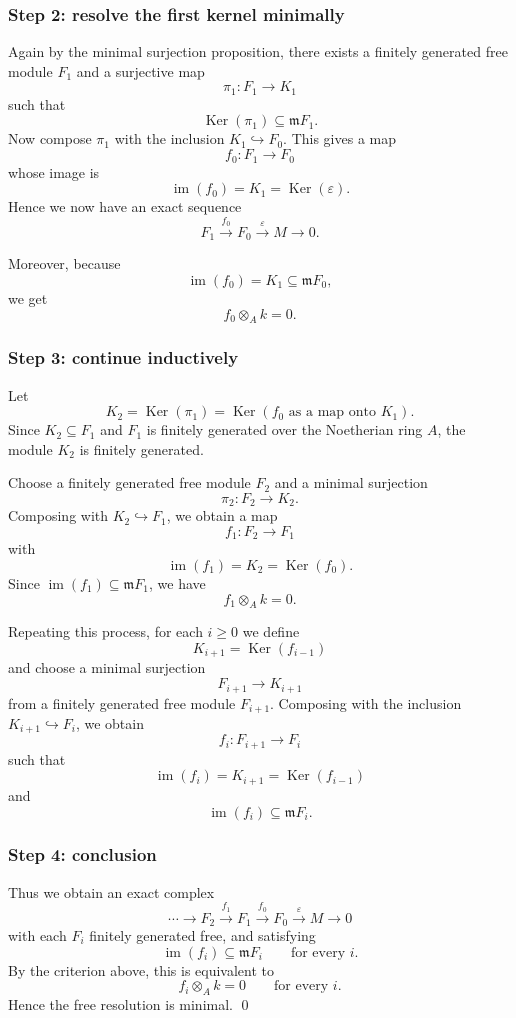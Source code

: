 \documentclass[12pt,a4paper]{article}
\theoremstyle{notespace}
\DeclareMathOperator{\Ker}{Ker}
\DeclareMathOperator{\im}{im}
\newcommand{\m}{\mathfrak m}
\begin{document}
\subsubsection*{Step 2: resolve the first kernel minimally}

Again by the minimal surjection proposition, there exists a finitely generated free module \(F_1\) and a surjective map
\[
\pi_1:F_1\to K_1
\]
such that
\[
\Ker(\pi_1)\subseteq \m F_1.
\]
Now compose \(\pi_1\) with the inclusion \(K_1\hookrightarrow F_0\). This gives a map
\[
f_0:F_1\to F_0
\]
whose image is
\[
\im(f_0)=K_1=\Ker(\varepsilon).
\]
Hence we now have an exact sequence
\[
F_1\xrightarrow{f_0}F_0\xrightarrow{\varepsilon}M\to 0.
\]

Moreover, because
\[
\im(f_0)=K_1\subseteq \m F_0,
\]
we get
\[
f_0\otimes_A k=0.
\]

\subsubsection*{Step 3: continue inductively}

Let
\[
K_2=\Ker(\pi_1)=\Ker(f_0 \text{ as a map onto }K_1).
\]
Since \(K_2\subseteq F_1\) and \(F_1\) is finitely generated over the Noetherian ring \(A\), the module \(K_2\) is finitely generated.

Choose a finitely generated free module \(F_2\) and a minimal surjection
\[
\pi_2:F_2\to K_2.
\]
Composing with \(K_2\hookrightarrow F_1\), we obtain a map
\[
f_1:F_2\to F_1
\]
with
\[
\im(f_1)=K_2=\Ker(f_0).
\]
Since \(\im(f_1)\subseteq \m F_1\), we have
\[
f_1\otimes_A k=0.
\]

Repeating this process, for each \(i\ge 0\) we define
\[
K_{i+1}=\Ker(f_{i-1})
\]
and choose a minimal surjection
\[
F_{i+1}\to K_{i+1}
\]
from a finitely generated free module \(F_{i+1}\). Composing with the inclusion \(K_{i+1}\hookrightarrow F_i\), we obtain
\[
f_i:F_{i+1}\to F_i
\]
such that
\[
\im(f_i)=K_{i+1}=\Ker(f_{i-1})
\]
and
\[
\im(f_i)\subseteq \m F_i.
\]

\subsubsection*{Step 4: conclusion}

Thus we obtain an exact complex
\[
\cdots \longrightarrow F_2 \xrightarrow{f_1} F_1 \xrightarrow{f_0} F_0 \xrightarrow{\varepsilon} M \longrightarrow 0
\]
with each \(F_i\) finitely generated free, and satisfying
\[
\im(f_i)\subseteq \m F_i
\qquad\text{for every }i.
\]
By the criterion above, this is equivalent to
\[
f_i\otimes_A k=0
\qquad\text{for every }i.
\]
Hence the free resolution is minimal. \qed
\end{document}
